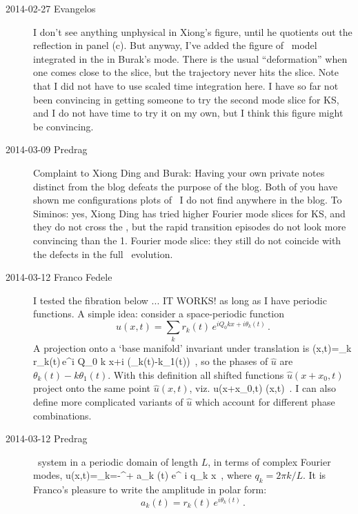 \begin{description}
\item[2014-02-27 Evangelos]
I don't see anything unphysical in Xiong's figure, until he %
quotients out the  reflection in panel (c). But anyway, I've added the figure of
\twomode\ model integrated in the {\sFslice} in Burak's mode.
There is the usual ``deformation'' when one comes close to the slice, but the trajectory
never hits the slice. Note that I did not have to use scaled time integration
here. I have so far not been convincing in getting someone to try the second mode
slice for KS, and I do not have time to try it on my own, but I think this figure
might be convincing.

\item[2014-03-09 Predrag] Complaint to Xiong Ding and Burak: Having your own
private notes distinct from the blog defeats the purpose of the blog.
Both of you have shown me configurations plots of \KS\ I do not find
anywhere in the blog. To Siminos: yes, Xiong Ding has tried higher
Fourier mode slices for KS, and they do not cross the \sliceBord, but the
rapid transition episodes do not look more convincing than the 1. Fourier
mode slice: they still do not coincide with the defects in the full
\statesp\ evolution.

\item[2014-03-12 Franco Fedele]
I tested the fibration below ... IT WORKS!  as long as I have periodic functions.
A simple idea: consider a space-periodic function
\[
 u(x,t)=\sum_k r_k(t)\,e^{i Q_0 k x+i \theta_k(t) }
\,.
\]
A projection onto a `base manifold'  invariant under translation is
\beq
{}(x,t)=\sum_k r_k(t)\,e^{i Q_0 k x+i (\theta_k(t)-k\theta_1(t)) }
\,,
so the phases of $\hat{u}$  are $\theta_k(t)-k\theta_1(t)$. With this definition all shifted functions $\hat{u}(x+x_0,t)$ project onto the same point $\hat{u}(x,t)$, viz.
\beq
{u}(x+x_0,t) \to {}(x,t)
\,.
I can also define more complicated variants of $\hat{u}$ which account for different phase combinations.

\item[2014-03-12 Predrag]
\KS\ system in a periodic domain
of length $L$, in terms of complex Fourier modes,
\beq
  u(x,t)=\sum_{k=-\infty}^{+\infty} a_k (t) e^{ i q_k x }
\,,
where $q_k = 2 \pi k / L$. It is Franco's pleasure to write the amplitude in
polar form:
\[
a_k (t) = r_k(t)\,e^{i \theta_k(t)}
\,.
\]



\end{description}
